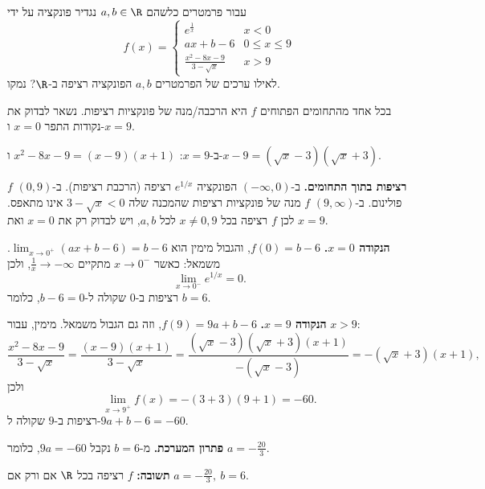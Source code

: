 
\begin{question}
עבור פרמטרים כלשהם $a,b\in\R$ נגדיר פונקציה על ידי
\[ f(x)=\begin{cases} e^{\frac1x} & x<0\\ ax+b-6 & 0\le x\le 9\\ \frac{x^2-8x-9}{3-\sqrt{x}} & x>9 \end{cases} \]
לאילו ערכים של הפרמטרים $a,b$ הפונקציה רציפה ב-$\R$? נמקו.
\end{question}

\begin{hint}
בכל אחד מהתחומים הפתוחים $f$ היא הרכבה/מנה של פונקציות רציפות. נשאר לבדוק את נקודות התפר $x=0$ ו-$x=9$.
\end{hint}

\begin{hint}
ב-$x=9$: $x^2-8x-9=(x-9)(x+1)$ ו-$x-9=(\sqrt x-3)(\sqrt x+3)$.
\end{hint}

\begin{solution}
\textbf{רציפות בתוך התחומים.} ב-$(-\infty,0)$ הפונקציה $e^{1/x}$ רציפה (הרכבת רציפות). ב-$(0,9)$ $f$ פולינום. ב-$(9,\infty)$ $f$ מנה של פונקציות רציפות שהמכנה שלה $3-\sqrt x<0$ אינו מתאפס. לכן $f$ רציפה בכל $x\neq0,9$ לכל $a,b$, ויש לבדוק רק את $x=0$ ואת $x=9$.

\textbf{הנקודה $x=0$.} $f(0)=b-6$, והגבול מימין הוא $\lim_{x\to0^+}(ax+b-6)=b-6$. משמאל: כאשר $x\to0^-$ מתקיים $\frac1x\to-\infty$, ולכן
\[ \lim_{x\to0^-}e^{1/x}=0. \]
רציפות ב-$0$ שקולה ל-$b-6=0$, כלומר $b=6$.

\textbf{הנקודה $x=9$.} $f(9)=9a+b-6$, וזה גם הגבול משמאל. מימין, עבור $x>9$:
\[ \frac{x^2-8x-9}{3-\sqrt x}=\frac{(x-9)(x+1)}{3-\sqrt x}=\frac{(\sqrt x-3)(\sqrt x+3)(x+1)}{-(\sqrt x-3)}=-(\sqrt x+3)(x+1), \]
ולכן
\[ \lim_{x\to9^+}f(x)=-(3+3)(9+1)=-60. \]
רציפות ב-$9$ שקולה ל-$9a+b-6=-60$.

\textbf{פתרון המערכת.} מ-$b=6$ נקבל $9a=-60$, כלומר $a=-\frac{20}{3}$.

\textbf{תשובה:} $f$ רציפה בכל $\R$ אם ורק אם $\boxed{a=-\tfrac{20}{3},\ b=6}$.
\end{solution}
